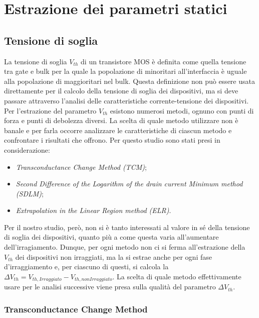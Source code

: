 \documentclass[
	a4paper,
	cleardoublepage=empty,
	headings=twolinechapter,
	numbers=autoenddot,
]{scrbook}
\begin{document}
\chapter{Estrazione dei parametri statici}


\section{Tensione di soglia}

La tensione di soglia $V_{th}$ di un transistore MOS è definita come quella tensione tra gate e bulk per la quale la popolazione di minoritari all'interfaccia è uguale alla popolazione di maggioritari nel bulk. Questa definizione non può essere usata direttamente per il calcolo della tensione di soglia dei dispositivi, ma si deve passare attraverso l'analisi delle caratteristiche corrente-tensione dei dispositivi. \\
Per l'estrazione del parametro $V_{th}$ esistono numerosi metodi, ognuno con punti di forza e punti di debolezza diversi. La scelta di quale metodo utilizzare non è banale e per farla occorre analizzare le caratteristiche di ciascun metodo e confrontare i risultati che offrono. Per questo studio sono stati presi in considerazione:

\begin{itemize}
  \item \emph{Transconductance Change Method (TCM)};
  \item \emph{Second Difference of the Logarithm of the drain current Minimum method (SDLM)};
  \item \emph{Extrapolation in the Linear Region method (ELR)}.
\end{itemize}

Per il nostro studio, però, non si è tanto interessati al valore in sé della tensione di soglia dei dispositivi, quanto più a come questa varia all'aumentare dell'irragiamento. Dunque, per ogni metodo non ci si ferma all'estrazione della $V_{th}$ dei dispositivi non irraggiati, ma la si estrae anche per ogni fase d'irraggiamento e, per ciascuno di questi, si calcola la $\Delta V_{th} = V_{th, Irraggiato}-V_{th, non Irraggiato}$. La scelta di quale metodo effettivamente usare per le analisi successive viene presa sulla qualità del parametro $\Delta V_{th}$.


\subsection{Transconductance Change Method}
\end{document}
